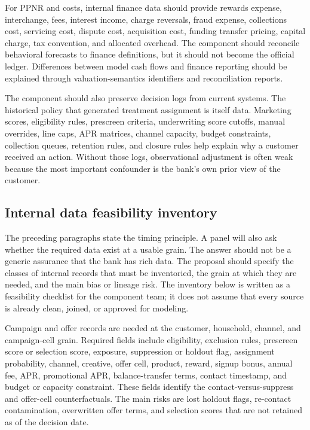 \documentclass[11pt]{article}
\newcommand{\1}{\mathbf{1}}
\begin{document}
For PPNR and costs, internal finance data should provide rewards expense,
interchange, fees, interest income, charge reversals, fraud expense,
collections cost, servicing cost, dispute cost, acquisition cost, funding
transfer pricing, capital charge, tax convention, and allocated overhead. The
component should reconcile behavioral forecasts to finance definitions, but it
should not become the official ledger. Differences between model cash flows and
finance reporting should be explained through valuation-semantics identifiers
and reconciliation reports.

The component should also preserve decision logs from current systems. The
historical policy that generated treatment assignment is itself data. Marketing
scores, eligibility rules, prescreen criteria, underwriting score cutoffs,
manual overrides, line caps, APR matrices, channel capacity, budget constraints,
collection queues, retention rules, and closure rules help explain why a
customer received an action. Without those logs, observational adjustment is
often weak because the most important confounder is the bank's own prior view
of the customer.

\subsection{Internal data feasibility inventory}
\label{subsec:internal-data-feasibility}

The preceding paragraphs state the timing principle. A panel will also ask
whether the required data exist at a usable grain. The answer should not be a
generic assurance that the bank has rich data. The proposal should specify the
classes of internal records that must be inventoried, the grain at which they
are needed, and the main bias or lineage risk. The inventory below is written
as a feasibility checklist for the component team; it does not assume that
every source is already clean, joined, or approved for modeling.

Campaign and offer records are needed at the customer, household, channel, and
campaign-cell grain. Required fields include eligibility, exclusion rules,
prescreen score or selection score, exposure, suppression or holdout flag,
assignment probability, channel, creative, offer cell, product, reward,
signup bonus, annual fee, APR, promotional APR, balance-transfer terms,
contact timestamp, and budget or capacity constraint. These fields identify
the contact-versus-suppress and offer-cell counterfactuals. The main risks are
lost holdout flags, re-contact contamination, overwritten offer terms, and
selection scores that are not retained as of the decision date.
\end{document}
